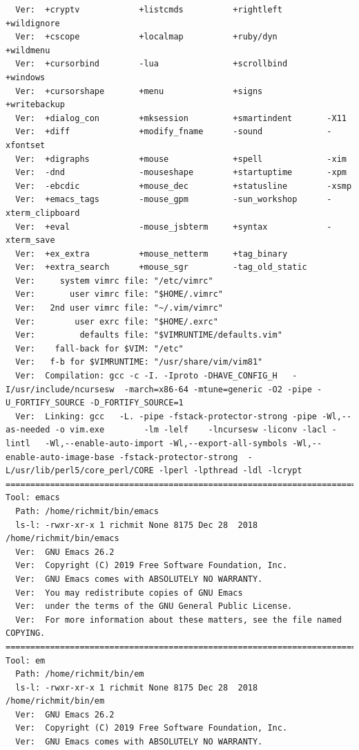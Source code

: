 \documentclass[11pt]{article}
\begin{document}
\begin{verbatim}
  Ver:  +cryptv            +listcmds          +rightleft         +wildignore
  Ver:  +cscope            +localmap          +ruby/dyn          +wildmenu
  Ver:  +cursorbind        -lua               +scrollbind        +windows
  Ver:  +cursorshape       +menu              +signs             +writebackup
  Ver:  +dialog_con        +mksession         +smartindent       -X11
  Ver:  +diff              +modify_fname      -sound             -xfontset
  Ver:  +digraphs          +mouse             +spell             -xim
  Ver:  -dnd               -mouseshape        +startuptime       -xpm
  Ver:  -ebcdic            +mouse_dec         +statusline        -xsmp
  Ver:  +emacs_tags        -mouse_gpm         -sun_workshop      -xterm_clipboard
  Ver:  +eval              -mouse_jsbterm     +syntax            -xterm_save
  Ver:  +ex_extra          +mouse_netterm     +tag_binary        
  Ver:  +extra_search      +mouse_sgr         -tag_old_static    
  Ver:     system vimrc file: "/etc/vimrc"
  Ver:       user vimrc file: "$HOME/.vimrc"
  Ver:   2nd user vimrc file: "~/.vim/vimrc"
  Ver:        user exrc file: "$HOME/.exrc"
  Ver:         defaults file: "$VIMRUNTIME/defaults.vim"
  Ver:    fall-back for $VIM: "/etc"
  Ver:   f-b for $VIMRUNTIME: "/usr/share/vim/vim81"
  Ver:  Compilation: gcc -c -I. -Iproto -DHAVE_CONFIG_H   -I/usr/include/ncursesw  -march=x86-64 -mtune=generic -O2 -pipe -U_FORTIFY_SOURCE -D_FORTIFY_SOURCE=1       
  Ver:  Linking: gcc   -L. -pipe -fstack-protector-strong -pipe -Wl,--as-needed -o vim.exe        -lm -lelf    -lncursesw -liconv -lacl -lintl   -Wl,--enable-auto-import -Wl,--export-all-symbols -Wl,--enable-auto-image-base -fstack-protector-strong  -L/usr/lib/perl5/core_perl/CORE -lperl -lpthread -ldl -lcrypt        
==========================================================================================
Tool: emacs
  Path: /home/richmit/bin/emacs
  ls-l: -rwxr-xr-x 1 richmit None 8175 Dec 28  2018 /home/richmit/bin/emacs
  Ver:  GNU Emacs 26.2
  Ver:  Copyright (C) 2019 Free Software Foundation, Inc.
  Ver:  GNU Emacs comes with ABSOLUTELY NO WARRANTY.
  Ver:  You may redistribute copies of GNU Emacs
  Ver:  under the terms of the GNU General Public License.
  Ver:  For more information about these matters, see the file named COPYING.
==========================================================================================
Tool: em
  Path: /home/richmit/bin/em
  ls-l: -rwxr-xr-x 1 richmit None 8175 Dec 28  2018 /home/richmit/bin/em
  Ver:  GNU Emacs 26.2
  Ver:  Copyright (C) 2019 Free Software Foundation, Inc.
  Ver:  GNU Emacs comes with ABSOLUTELY NO WARRANTY.

\end{verbatim}
\end{document}
